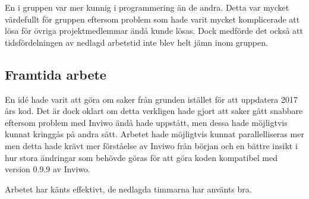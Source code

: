 \documentclass[a4paper,12pt,twoside,openright]{report}
\begin{document}
En i gruppen var mer kunnig i programmering än de andra. Detta var mycket värdefullt för gruppen eftersom problem som hade varit mycket komplicerade att lösa för övriga projektmedlemmar ändå kunde lösas. Dock medförde det också att tidsfördelningen av nedlagd arbetstid inte blev helt jämn inom gruppen.  

\subsection{Framtida arbete}
En idé hade varit att göra om saker från grunden istället för att uppdatera 2017 års kod. Det är dock oklart om detta verkligen hade gjort att saker gått snabbare eftersom problem med Inviwo ändå hade uppstått, men dessa hade möjligtvis kunnat kringgås på andra sätt. Arbetet hade möjligtvis kunnat parallelliseras mer men detta hade krävt mer förståelse av Inviwo från början och en bättre insikt i hur stora ändringar som behövde göras för att göra koden kompatibel med version 0.9.9 av Inviwo.  

Arbetet har känts effektivt, de nedlagda timmarna har använts bra. 



\newpage
{}
\printbibliography{}
\end{document}
